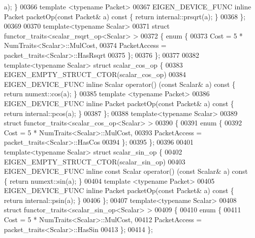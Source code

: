 \begin{DoxyCode}
      a); \}
00366   \textcolor{keyword}{template} <\textcolor{keyword}{typename} Packet>
00367   EIGEN\_DEVICE\_FUNC \textcolor{keyword}{inline} Packet packetOp(\textcolor{keyword}{const} Packet& a)\textcolor{keyword}{ const }\{ \textcolor{keywordflow}{return} internal::prsqrt(a); \}
00368 \};
00369 
00370 \textcolor{keyword}{template}<\textcolor{keyword}{typename} Scalar>
00371 \textcolor{keyword}{struct }functor\_traits<scalar\_rsqrt\_op<Scalar> >
00372 \{ \textcolor{keyword}{enum} \{
00373     Cost = 5 * NumTraits<Scalar>::MulCost,
00374     PacketAccess = packet\_traits<Scalar>::HasRsqrt
00375   \};
00376 \};
00377 
00382 \textcolor{keyword}{template}<\textcolor{keyword}{typename} Scalar> \textcolor{keyword}{struct }scalar\_cos\_op \{
00383   EIGEN\_EMPTY\_STRUCT\_CTOR(scalar\_cos\_op)
00384   EIGEN\_DEVICE\_FUNC \textcolor{keyword}{inline} Scalar operator() (\textcolor{keyword}{const} Scalar& a)\textcolor{keyword}{ const }\{ \textcolor{keywordflow}{return} numext::cos(a); \}
00385   \textcolor{keyword}{template} <\textcolor{keyword}{typename} Packet>
00386   EIGEN\_DEVICE\_FUNC \textcolor{keyword}{inline} Packet packetOp(\textcolor{keyword}{const} Packet& a)\textcolor{keyword}{ const }\{ \textcolor{keywordflow}{return} internal::pcos(a); \}
00387 \};
00388 \textcolor{keyword}{template}<\textcolor{keyword}{typename} Scalar>
00389 \textcolor{keyword}{struct }functor\_traits<scalar\_cos\_op<Scalar> >
00390 \{
00391   \textcolor{keyword}{enum} \{
00392     Cost = 5 * NumTraits<Scalar>::MulCost,
00393     PacketAccess = packet\_traits<Scalar>::HasCos
00394   \};
00395 \};
00396 
00401 \textcolor{keyword}{template}<\textcolor{keyword}{typename} Scalar> \textcolor{keyword}{struct }scalar\_sin\_op \{
00402   EIGEN\_EMPTY\_STRUCT\_CTOR(scalar\_sin\_op)
00403   EIGEN\_DEVICE\_FUNC \textcolor{keyword}{inline} \textcolor{keyword}{const} Scalar operator() (\textcolor{keyword}{const} Scalar& a)\textcolor{keyword}{ const }\{ \textcolor{keywordflow}{return} numext::sin(a); \}
00404   \textcolor{keyword}{template} <\textcolor{keyword}{typename} Packet>
00405   EIGEN\_DEVICE\_FUNC \textcolor{keyword}{inline} Packet packetOp(\textcolor{keyword}{const} Packet& a)\textcolor{keyword}{ const }\{ \textcolor{keywordflow}{return} internal::psin(a); \}
00406 \};
00407 \textcolor{keyword}{template}<\textcolor{keyword}{typename} Scalar>
00408 \textcolor{keyword}{struct }functor\_traits<scalar\_sin\_op<Scalar> >
00409 \{
00410   \textcolor{keyword}{enum} \{
00411     Cost = 5 * NumTraits<Scalar>::MulCost,
00412     PacketAccess = packet\_traits<Scalar>::HasSin
00413   \};
00414 \};

\end{DoxyCode}

